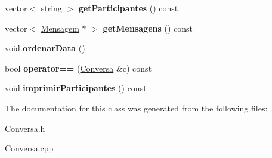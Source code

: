 \begin{DoxyCompactItemize}
\item 
\hypertarget{class_conversa_afe17736f50a6ab6b471be57c64da79dc}{}vector$<$ string $>$ {\bfseries get\+Participantes} () const \label{class_conversa_afe17736f50a6ab6b471be57c64da79dc}

\item 
\hypertarget{class_conversa_a72d2a6000bbb9438417c456031bf8ced}{}vector$<$ \hyperlink{class_mensagem}{Mensagem} $\ast$ $>$ {\bfseries get\+Mensagens} () const \label{class_conversa_a72d2a6000bbb9438417c456031bf8ced}

\item 
\hypertarget{class_conversa_a8f575a8d5137b94f5190e85998b01b8d}{}void {\bfseries ordenar\+Data} ()\label{class_conversa_a8f575a8d5137b94f5190e85998b01b8d}

\item 
\hypertarget{class_conversa_a3a7785ca7dfa6154bd33566d5fe2ed04}{}bool {\bfseries operator==} (\hyperlink{class_conversa}{Conversa} \&c) const \label{class_conversa_a3a7785ca7dfa6154bd33566d5fe2ed04}

\item 
\hypertarget{class_conversa_a6c783d4e16c1e7c76406eedbccd13da8}{}void {\bfseries imprimir\+Participantes} () const \label{class_conversa_a6c783d4e16c1e7c76406eedbccd13da8}

\end{DoxyCompactItemize}


The documentation for this class was generated from the following files\+:\begin{DoxyCompactItemize}
\item 
Conversa.\+h\item 
Conversa.\+cpp\end{DoxyCompactItemize}
